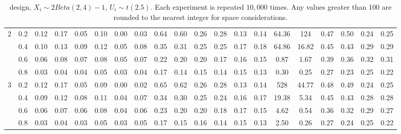 \begin{table}
\begin{threeparttable}
\begin{tabular}{c c|c c c c c c|c c c c c c|c c c c c c}
\multirow{4}{*}{2} & 0.2 & 0.12 & 0.17 & 0.05 & 0.10 & 0.00 & 0.03 & 0.64 & 0.60 & 0.26 & 0.28 & 0.13 & 0.14 & 64.36 & 124 & 0.47 & 0.50 & 0.24 & 0.25 \\
& 0.4 & 0.10 & 0.13 & 0.09 & 0.12 & 0.05 & 0.08 & 0.35 & 0.31 & 0.25 & 0.25 & 0.17 & 0.18 & 64.86 & 16.82 & 0.45 & 0.43 & 0.29 & 0.29 \\
& 0.6 & 0.06 & 0.08 & 0.07 & 0.08 & 0.05 & 0.07 & 0.22 & 0.20 & 0.20 & 0.17 & 0.16 & 0.15 & 0.87 & 1.67 & 0.39 & 0.36 & 0.32 & 0.31 \\
& 0.8 & 0.03 & 0.04 & 0.04 & 0.05 & 0.03 & 0.04 & 0.17 & 0.14 & 0.15 & 0.14 & 0.15 & 0.13 & 0.30 & 0.25 & 0.27 & 0.23 & 0.25 & 0.22 \\
\hline
\multirow{4}{*}{3} & 0.2 & 0.12 & 0.17 & 0.05 & 0.09 & 0.00 & 0.02 & 0.65 & 0.62 & 0.26 & 0.28 & 0.13 & 0.14 & 528 & 44.77 & 0.48 & 0.49 & 0.24 & 0.25 \\
& 0.4 & 0.09 & 0.12 & 0.08 & 0.11 & 0.04 & 0.07 & 0.34 & 0.30 & 0.25 & 0.24 & 0.16 & 0.17 & 19.38 & 5.34 & 0.45 & 0.43 & 0.28 & 0.28 \\
& 0.6 & 0.06 & 0.07 & 0.06 & 0.08 & 0.04 & 0.06 & 0.23 & 0.20 & 0.20 & 0.18 & 0.17 & 0.15 & 4.62 & 0.54 & 0.36 & 0.32 & 0.29 & 0.27 \\
& 0.8 & 0.03 & 0.04 & 0.03 & 0.05 & 0.03 & 0.05 & 0.17 & 0.15 & 0.16 & 0.14 & 0.15 & 0.13 & 2.50 & 0.26 & 0.27 & 0.24 & 0.25 & 0.22 \\
\hline
\hline
\end{tabular}
\caption*{\citet{lee2008randomized} design, $X_i \sim 2Beta(2,4) - 1$, $U_i \sim t(2.5)$. Each experiment is repeated $10,000$ times. Any values greater than 100 are rounded to the nearest integer for space considerations.}
\label{table estimation lee beta t}
\end{threeparttable}
\end{table}
